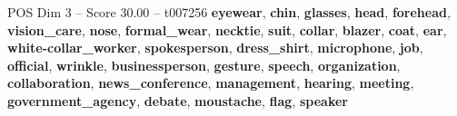 \begin{textsample}{POS Dim 3 – Score 30.00 – t007256}  \label{ex:f3_pos_030}
\textbf{eyewear}, \textbf{chin}, \textbf{glasses}, \textbf{head}, \textbf{forehead}, \textbf{vision\_care}, \textbf{nose}, \textbf{formal\_wear}, \textbf{necktie}, \textbf{suit}, \textbf{collar}, \textbf{blazer}, \textbf{coat}, \textbf{ear}, \textbf{white-collar\_worker}, \textbf{spokesperson}, \textbf{dress\_shirt}, \textbf{microphone}, \textbf{job}, \textbf{official}, \textbf{wrinkle}, \textbf{businessperson}, \textbf{gesture}, \textbf{speech}, \textbf{organization}, \textbf{collaboration}, \textbf{news\_conference}, \textbf{management}, \textbf{hearing}, \textbf{meeting}, \textbf{government\_agency}, \textbf{debate}, \textbf{moustache}, \textbf{flag}, \textbf{speaker}

\end{textsample}
